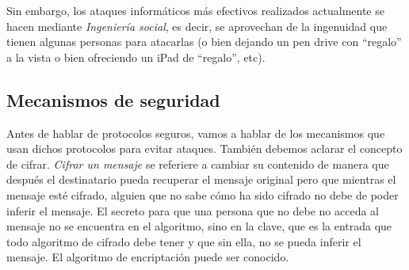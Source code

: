 \documentclass[10pt,a4paper,spanish]{report}
\begin{document}
Sin embargo, los ataques informáticos más efectivos realizados actualmente se hacen mediante \textit{\textcolor{tema2}{Ingeniería social}}, es decir, se aprovechan de la ingenuidad que tienen algunas personas para atacarlas (o bien dejando un pen drive con ``regalo'' a la vista o bien ofreciendo un iPad de ``regalo'', etc).

\subsection{\textcolor{tema2}Mecanismos de seguridad}
Antes de hablar de protocolos seguros, vamos a hablar de los mecanismos que usan dichos protocolos para evitar ataques. También debemos aclarar el concepto de cifrar. \textit{\textcolor{tema2}{Cifrar un mensaje}} se referiere a cambiar su contenido de manera que después el destinatario pueda recuperar el mensaje original pero que mientras el mensaje esté cifrado, alguien que no sabe cómo ha sido cifrado no debe de poder inferir el mensaje. El secreto para que una persona que no debe no acceda al mensaje no se encuentra en el algoritmo, sino en la clave, que es la entrada que todo algoritmo de cifrado debe tener y que sin ella, no se pueda inferir el mensaje. El algoritmo de encriptación puede ser conocido.
\end{document}
